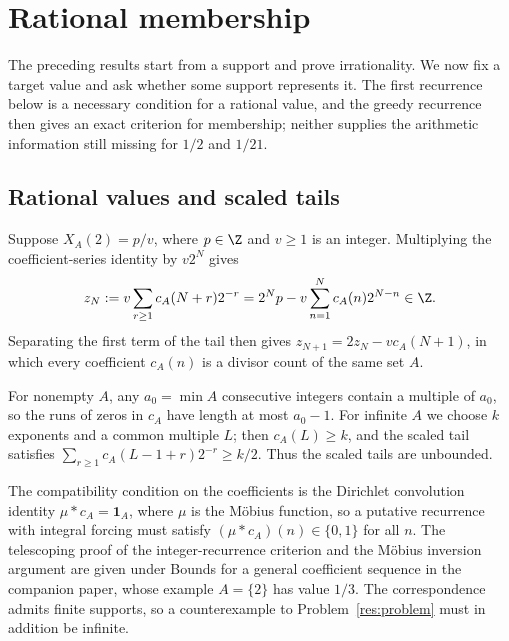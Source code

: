 \documentclass[11pt]{article}
\begin{document}
\section{Rational membership}\label{sec:rational-membership}
The preceding results start from a support and prove irrationality. We
now fix a target value and ask whether some support represents it. The
first recurrence below is a necessary condition for a rational value,
and the greedy recurrence then gives an exact criterion for membership;
neither supplies the arithmetic information still missing for $1/2$ and
$1/21$.

\subsection{Rational values and scaled tails}\label{sec:forced}
Suppose $X_A(2)=p/v$, where $p\in\Z$ and $v\ge1$ is an integer.
Multiplying the coefficient-series identity by $v2^N$ gives
\[
 z_N:=v\sum_{r\ge1}c_A(N+r)2^{-r}
     =2^Np-v\sum_{n=1}^{N}c_A(n)2^{N-n}\in\Z.
\]
Separating the first term of the tail then gives
$z_{N+1}=2z_N-vc_A(N+1)$, in which every coefficient $c_A(n)$ is a
divisor count of the same set $A$.

For nonempty $A$, any $a_0=\min A$ consecutive integers contain a
multiple of $a_0$, so the runs of zeros in $c_A$ have length at most
$a_0-1$. For infinite $A$ we choose $k$ exponents and a common multiple
$L$; then $c_A(L)\ge k$, and the scaled tail satisfies
$\sum_{r\ge1}c_A(L-1+r)2^{-r}\ge k/2$. Thus the scaled tails are
unbounded.

The compatibility condition on the coefficients is the Dirichlet
convolution identity $\mu*c_A=\mathbf1_A$, where $\mu$ is the
M\"obius function, so a putative recurrence with integral forcing must
satisfy $(\mu*c_A)(n)\in\{0,1\}$ for all $n$. The telescoping proof of
the integer-recurrence criterion and the M\"obius inversion argument
are given under
{Bounds for a general coefficient sequence} in the companion paper,
whose example $A=\{2\}$ has value $1/3$. The correspondence admits
finite supports, so a counterexample to Problem~\ref{res:problem} must
in addition be infinite.
\end{document}
